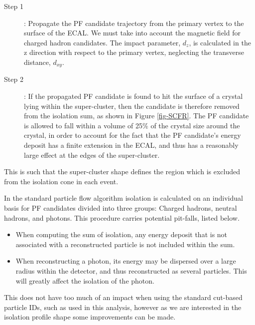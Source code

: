 \begin{description}
	\item[Step 1]: Propagate the PF candidate trajectory from the primary vertex to the surface of the ECAL. We must take into account the magnetic field for charged hadron candidates. The impact parameter, $d_z$, is calculated in the z direction with respect to the primary vertex, neglecting the transverse distance, $d_{xy}$. 
	\item[Step 2]: If the propagated PF candidate is found to hit the surface of a crystal lying within the super-cluster, then the candidate is therefore removed from the isolation sum, as shown in Figure \ref{fig-SCFR}. The PF candidate is allowed to fall within a volume of 25\% of the crystal size around the crystal, in order to account for the fact that the PF candidate's energy deposit has a finite extension in the ECAL, and thus has a reasonably large effect at the edges of the super-cluster. 
\end{description}

This is such that the super-cluster shape defines the region which is excluded from the isolation cone in each event.

In the standard particle flow algorithm isolation is calculated on an individual basis for PF candidates divided into three groups: Charged hadrons, neutral hadrons, and photons. This procedure carries potential pit-falls, listed below.

\begin{itemize}
	\item When computing the sum of isolation, any energy deposit that is not associated with a reconstructed particle is not included within the sum.  
	\item When reconstructing a photon, its energy may be dispersed over a large radius within the detector, and thus reconstructed as several particles. This will greatly affect the isolation of the photon.
\end{itemize}

This does not have too much of an impact when using the standard cut-based particle IDs, such as used in this analysis, however as we are interested in the isolation profile shape some improvements can be made. 

